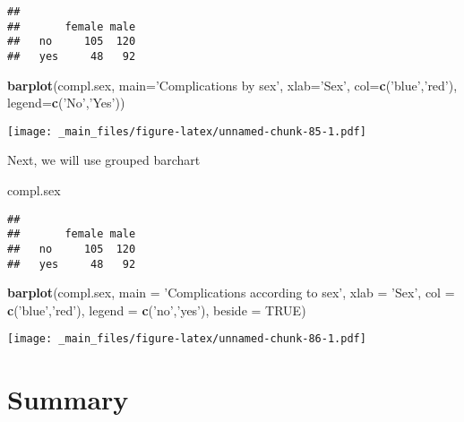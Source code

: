 \documentclass[]{book}
\newenvironment{Shaded}{\begin{snugshade}}{\end{snugshade}}
\newcommand{\KeywordTok}[1]{\textcolor[rgb]{0.13,0.29,0.53}{\textbf{{#1}}}}
\newcommand{\DataTypeTok}[1]{\textcolor[rgb]{0.13,0.29,0.53}{{#1}}}
\newcommand{\StringTok}[1]{\textcolor[rgb]{0.31,0.60,0.02}{{#1}}}
\newcommand{\OtherTok}[1]{\textcolor[rgb]{0.56,0.35,0.01}{{#1}}}
\newcommand{\NormalTok}[1]{{#1}}
\theoremstyle{definition}
\theoremstyle{definition}
\theoremstyle{remark}
\begin{document}
\begin{verbatim}
##      
##       female male
##   no     105  120
##   yes     48   92
\end{verbatim}

\begin{Shaded}
\begin{Highlighting}[]
\KeywordTok{barplot}\NormalTok{(compl.sex,}
        \DataTypeTok{main=}\StringTok{'Complications by sex'}\NormalTok{,}
        \DataTypeTok{xlab=}\StringTok{'Sex'}\NormalTok{,}
        \DataTypeTok{col=}\KeywordTok{c}\NormalTok{(}\StringTok{'blue'}\NormalTok{,}\StringTok{'red'}\NormalTok{),}
        \DataTypeTok{legend=}\KeywordTok{c}\NormalTok{(}\StringTok{'No'}\NormalTok{,}\StringTok{'Yes'}\NormalTok{))}
\end{Highlighting}
\end{Shaded}

\texttt{[image: \_main\_files/figure-latex/unnamed-chunk-85-1.pdf]}

Next, we will use grouped barchart

\begin{Shaded}
\begin{Highlighting}[]
\NormalTok{compl.sex}
\end{Highlighting}
\end{Shaded}

\begin{verbatim}
##      
##       female male
##   no     105  120
##   yes     48   92
\end{verbatim}

\begin{Shaded}
\begin{Highlighting}[]
\KeywordTok{barplot}\NormalTok{(compl.sex,}
        \DataTypeTok{main =} \StringTok{'Complications according to sex'}\NormalTok{,}
        \DataTypeTok{xlab =} \StringTok{'Sex'}\NormalTok{,}
        \DataTypeTok{col =} \KeywordTok{c}\NormalTok{(}\StringTok{'blue'}\NormalTok{,}\StringTok{'red'}\NormalTok{),}
        \DataTypeTok{legend =} \KeywordTok{c}\NormalTok{(}\StringTok{'no'}\NormalTok{,}\StringTok{'yes'}\NormalTok{),}
        \DataTypeTok{beside =} \OtherTok{TRUE}\NormalTok{)}
\end{Highlighting}
\end{Shaded}

\texttt{[image: \_main\_files/figure-latex/unnamed-chunk-86-1.pdf]}

\section{Summary}\label{summary-2}
\end{document}
